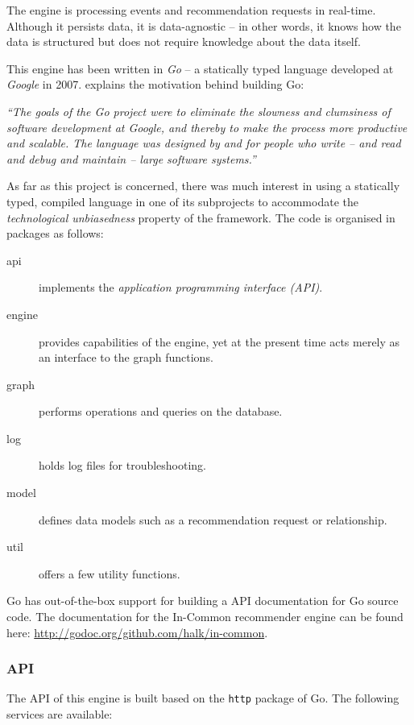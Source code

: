 The engine is processing events and recommendation requests in real-time. Although it persists data, it is data-agnostic -- in other words, it knows how the data is structured but does not require knowledge about the data itself.

This engine has been written in \emph{Go} -- a statically typed language developed at \emph{Google} in 2007. \citet{pike12} explains the motivation behind building Go:

\begin{adjustwidth}{1cm}{}
\emph{``The goals of the Go project were to eliminate the slowness and clumsiness of software development at Google, and thereby to make the process more productive and scalable. The language was designed by and for people who write -- and read and debug and maintain -- large software systems.''}
\end{adjustwidth}

As far as this project is concerned, there was much interest in using a statically typed, compiled language in one of its subprojects to accommodate the \emph{technological unbiasedness} property of the framework. The code is organised in packages as follows:

\begin{description}
    \item[api] implements the \emph{application programming interface (API)}.
    \item[engine] provides capabilities of the engine, yet at the present time acts merely as an interface to the graph functions.
    \item[graph] performs operations and queries on the database.
    \item[log] holds log files for troubleshooting.
    \item[model] defines data models such as a recommendation request or relationship.
    \item[util] offers a few utility functions.
\end{description}

Go has out-of-the-box support for building a API documentation for Go source code. The documentation for the In-Common recommender engine can be found here: \url{http://godoc.org/github.com/halk/in-common}.

\subsubsection{API}

The API of this engine is built based on the \texttt{http} package of Go. The following services are available:

